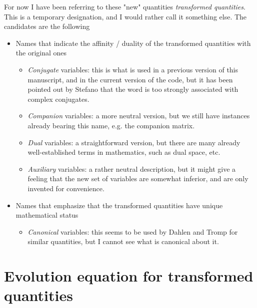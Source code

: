 \begin{todoremark}
For now I have been referring to these "new" quantities \textit{transformed quantities}. This is a temporary designation, and I would rather call it something else. The candidates are the following
\begin{itemize}
    \item Names that indicate the affinity / duality of the transformed quantities with the original ones
    \begin{itemize}
        \item \textit{Conjugate} variables: this is what is used in a previous version of this manuscript, and in the current version of the code, but it has been pointed out by Stefano that the word is too strongly associated with complex conjugates.
        \item \textit{Companion} variables: a more neutral version, but we still have instances already bearing this name, e.g. the companion matrix.
        \item \textit{Dual} variables: a straightforward version, but there are many already well-established terms in mathematics, such as dual space, etc.
        \item \textit{Auxiliary} variables: a rather neutral description, but it might give a feeling that the new set of variables are somewhat inferior, and are only invented for convenience.
    \end{itemize}
    \item Names that emphasize that the transformed quantities have unique mathematical status
    \begin{itemize}
        \item \textit{Canonical} variables: this seems to be used by Dahlen and Tromp for similar quantities, but I cannot see what is canonical about it.
    \end{itemize}
\end{itemize}
\end{todoremark}


\section{Evolution equation for transformed quantities}

